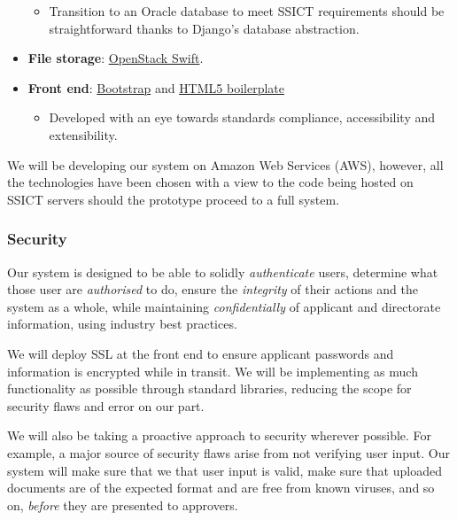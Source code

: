 \documentclass[12pt,a4paper,twosided]{article}
\begin{document}
\begin{itemize}
  \begin{itemize}
  \itemsep1pt\parskip0pt
  \item
    Transition to an Oracle database to meet SSICT requirements should
    be straightforward thanks to Django's database abstraction.
  \end{itemize}
\item
  \textbf{File storage}: \href{http://swift.openstack.org}{OpenStack
  Swift}.
\item
  \textbf{Front end}: \href{http://getbootstrap.com/}{Bootstrap} and
  \href{http://html5boilerplate.com/}{HTML5 boilerplate}

  \begin{itemize}
  \itemsep1pt\parskip0pt
  \item
    Developed with an eye towards standards compliance, accessibility
    and extensibility.
  \end{itemize}
\end{itemize}

We will be developing our system on Amazon Web Services (AWS), however,
all the technologies have been chosen with a view to the code being
hosted on SSICT servers should the prototype proceed to a full system.

\subsubsection{Security}

Our system is designed to be able to solidly \emph{authenticate} users,
determine what those user are \emph{authorised} to do, ensure the
\emph{integrity} of their actions and the system as a whole, while
maintaining \emph{confidentially} of applicant and directorate
information, using industry best practices.

We will deploy SSL at the front end to ensure applicant passwords and
information is encrypted while in transit. We will be implementing as
much functionality as possible through standard libraries, reducing the
scope for security flaws and error on our part.

We will also be taking a proactive approach to security wherever
possible. For example, a major source of security flaws arise from not
verifying user input. Our system will make sure that we that user input
is valid, make sure that uploaded documents are of the expected format
and are free from known viruses, and so on, \emph{before} they are
presented to approvers.


\end{document}
